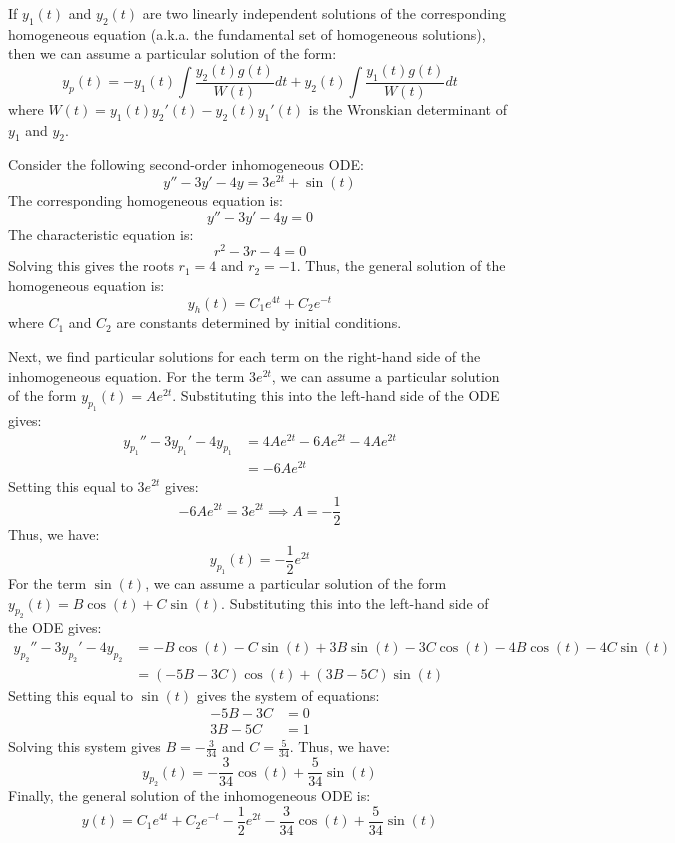 \documentclass[11pt]{article}
\begin{document}
\begin{definition}
    If $y_1(t)$ and $y_2(t)$ are two linearly independent solutions of the corresponding homogeneous equation (a.k.a. the fundamental set of homogeneous solutions), then we can assume a particular solution of the form:
    $$y_p(t) = -y_1(t) \int \frac{y_2(t) g(t)}{W(t)} dt + y_2(t) \int \frac{y_1(t) g(t)}{W(t)} dt$$
    where \( W(t) = y_1(t)y_2'(t) - y_2(t)y_1'(t) \) is the Wronskian determinant of \( y_1 \) and \( y_2 \).
\end{definition}


\begin{example}
    Consider the following second-order inhomogeneous ODE:
    $$y'' - 3y'- 4y = 3e^{2t} + \sin(t)$$
    The corresponding homogeneous equation is:
    $$y'' - 3y' - 4y = 0$$
    The characteristic equation is:
    $$r^2 - 3r - 4 = 0$$
    Solving this gives the roots \( r_1 = 4 \) and \( r_2 = -1 \). Thus, the general solution of the homogeneous equation is:
    $$y_h(t) = C_1 e^{4t} + C_2 e^{-t}$$
    where \( C_1 \) and \( C_2 \) are constants determined by initial conditions.
    
    Next, we find particular solutions for each term on the right-hand side of the inhomogeneous equation. For the term \( 3e^{2t} \), we can assume a particular solution of the form $y_{p_1}(t) = A e^{2t}$. Substituting this into the left-hand side of the ODE gives:
    \begin{align*}
        y_{p_1}'' - 3y_{p_1}' - 4y_{p_1} &= 4A e^{2t} - 6A e^{2t} - 4A e^{2t} \\
        &= -6A e^{2t}
    \end{align*}
    Setting this equal to \( 3e^{2t} \) gives:
    $$-6A e^{2t} = 3e^{2t} \implies A = -\frac{1}{2}$$
    Thus, we have:
    $$y_{p_1}(t) = -\frac{1}{2} e^{2t}$$
    For the term \( \sin(t) \), we can assume a particular solution of the form \( y_{p_2}(t) = B \cos(t) + C \sin(t) \). Substituting this into the left-hand side of the ODE gives:
    \begin{align*}
        y_{p_2}'' - 3y_{p_2}' - 4y_{p_2} &= -B \cos(t) - C \sin(t) + 3B \sin(t) - 3C \cos(t) - 4B \cos(t) - 4C \sin(t) \\
        &= (-5B - 3C) \cos(t) + (3B - 5C) \sin(t)
    \end{align*}
    Setting this equal to \( \sin(t) \) gives the system of equations:
    \begin{align*}
        -5B - 3C &= 0 \\
        3B - 5C &= 1
    \end{align*}
    Solving this system gives \( B = -\frac{3}{34} \) and \( C = \frac{5}{34} \). Thus, we have:
    $$y_{p_2}(t) = -\frac{3}{34} \cos(t) + \frac{5}{34} \sin(t)$$
    Finally, the general solution of the inhomogeneous ODE is:
    $$y(t) = C_1 e^{4t} + C_2 e^{-t} - \frac{1}{2} e^{2t} - \frac{3}{34} \cos(t) + \frac{5}{34} \sin(t)$$
\end{example}
\end{document}
